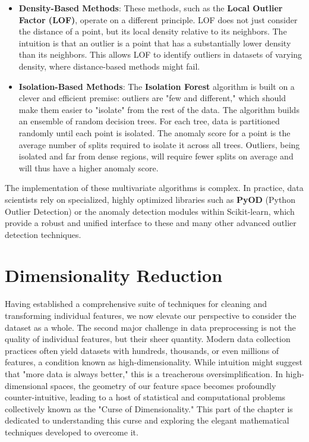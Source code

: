 \begin{itemize}
\begin{itemize}
    \item \textbf{Density-Based Methods}: These methods, such as the \textbf{Local Outlier Factor (LOF)}, operate on a different principle. LOF does not just consider the distance of a point, but its local density relative to its neighbors. The intuition is that an outlier is a point that has a substantially lower density than its neighbors. This allows LOF to identify outliers in datasets of varying density, where distance-based methods might fail.
    
    \item \textbf{Isolation-Based Methods}: The \textbf{Isolation Forest} algorithm is built on a clever and efficient premise: outliers are "few and different," which should make them easier to "isolate" from the rest of the data. The algorithm builds an ensemble of random decision trees. For each tree, data is partitioned randomly until each point is isolated. The anomaly score for a point is the average number of splits required to isolate it across all trees. Outliers, being isolated and far from dense regions, will require fewer splits on average and will thus have a higher anomaly score.
\end{itemize}

\begin{remark}
The implementation of these multivariate algorithms is complex. In practice, data scientists rely on specialized, highly optimized libraries such as \textbf{PyOD} (Python Outlier Detection) or the anomaly detection modules within Scikit-learn, which provide a robust and unified interface to these and many other advanced outlier detection techniques.
\end{remark}

\part{Dimensionality Reduction}

Having established a comprehensive suite of techniques for cleaning and transforming individual features, we now elevate our perspective to consider the dataset as a whole. The second major challenge in data preprocessing is not the quality of individual features, but their sheer quantity. Modern data collection practices often yield datasets with hundreds, thousands, or even millions of features, a condition known as high-dimensionality. While intuition might suggest that "more data is always better," this is a treacherous oversimplification. In high-dimensional spaces, the geometry of our feature space becomes profoundly counter-intuitive, leading to a host of statistical and computational problems collectively known as the "Curse of Dimensionality." This part of the chapter is dedicated to understanding this curse and exploring the elegant mathematical techniques developed to overcome it.


\end{itemize}
